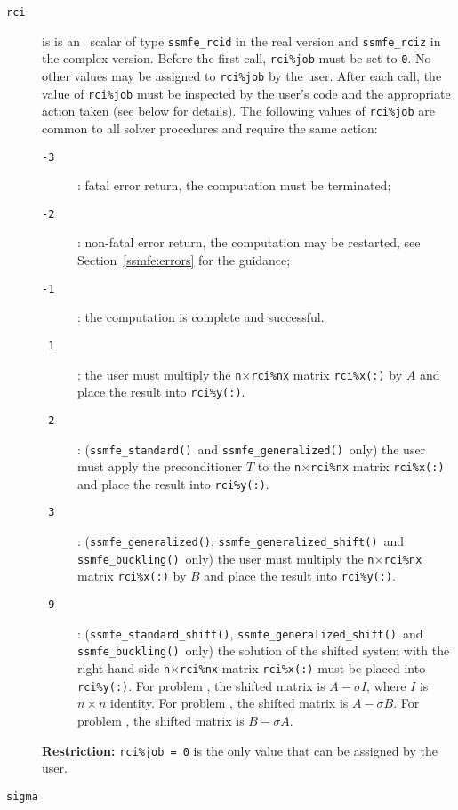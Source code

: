 \begin{description}
%
\item[\texttt{rci}] is is an \intentinout\ scalar  of type
{\tt ssmfe\_rcid} in the real version and
{\tt ssmfe\_rciz} in the complex version.
Before the first call, {\tt rci\%job} must be set to {\tt 0}.
No other values may be assigned to {\tt rci\%job} by the user.
After each call,
the value of {\tt rci\%job} must be inspected by the user's code
and the appropriate action taken (see below for details).
The following values of {\tt rci\%job}
are common to all solver procedures 
and require the same action: 
%
\begin{description}
%
\item[\texttt{-3}]: fatal error return, the computation must be terminated;
%
\item[\texttt{-2}]: 
non-fatal error return, the computation may be restarted,
see Section~\ref{ssmfe:errors} for the guidance;
%
\item[\texttt{-1}]: the computation is complete and successful.
%
\item[\texttt{~1}]: 
the user must multiply the {\tt n}$\times${\tt rci\%nx} matrix
   {\tt rci\%x(:)} by $A$ and place the result into {\tt rci\%y(:)}.
%
\item[\texttt{~2}]: 
({\tt ssmfe\_standard()}\ and {\tt ssmfe\_generalized()}\ only)
the user must
apply the preconditioner $T$ to the {\tt n}$\times${\tt rci\%nx} matrix
   {\tt rci\%x(:)} and place the result into {\tt rci\%y(:)}.
%
\item[\texttt{~3}]: 
({\tt ssmfe\_generalized()}, {\tt ssmfe\_generalized\_shift()}\
and {\tt ssmfe\_buckling()}\ only)
the user must multiply the {\tt n}$\times${\tt rci\%nx} matrix
   {\tt rci\%x(:)} by $B$ and place the result into {\tt rci\%y(:)}.
%
\item[\texttt{~9}]:
({\tt ssmfe\_standard\_shift()}, {\tt ssmfe\_generalized\_shift()}\
and {\tt ssmfe\_buckling()}\ only)
the solution of the shifted system
with the right-hand side {\tt n}$\times${\tt rci\%nx} matrix {\tt rci\%x(:)}
   must be placed into {\tt rci\%y(:)}.
For problem \EqnRef{ssmfe:eqn:evp}, the shifted matrix is $A - \sigma I$,
where $I$ is $n\times n$ identity.
For problem \EqnRef{ssmfe:eqn:evp.g}, the shifted matrix is $A - \sigma B$.
For problem , the shifted matrix is $B - \sigma A$.
%
\end{description}
%
{\bf Restriction:} 
{\tt rci\%job = 0} is the only value that can be assigned by the user.
%
\item[\texttt{sigma}] 

\end{description}
